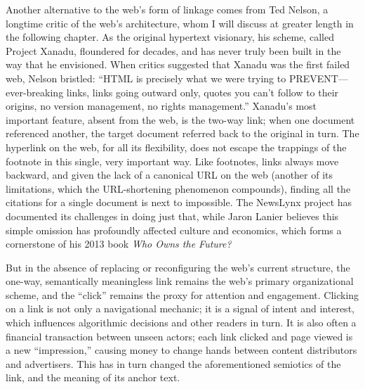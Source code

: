 Another alternative to the web's form of linkage comes from Ted Nelson, a longtime critic of the web's architecture, whom I will discuss at greater length in the following chapter. As the original hypertext visionary, his scheme, called Project Xanadu, floundered for decades, and has never truly been built in the way that he envisioned. When critics suggested that Xanadu was the first failed web, Nelson bristled: ``HTML is precisely what we were trying to PREVENT---ever-breaking links, links going outward only, quotes you can't follow to their origins, no version management, no rights management.''\autocite{nelson_ted_1999} Xanadu's most important feature, absent from the web, is the two-way link; when one document referenced another, the target document referred back to the original in turn. The hyperlink on the web, for all its flexibility, does not escape the trappings of the footnote in this single, very important way. Like footnotes, links always move backward, and given the lack of a canonical URL on the web (another of its limitations, which the URL-shortening phenomenon compounds), finding all the citations for a single document is next to impossible. The NewsLynx project has documented its challenges in doing just that, while Jaron Lanier believes this simple omission has profoundly affected culture and economics, which forms a cornerstone of his 2013 book \emph{Who Owns the Future?}\autocite[Chapter 18]{lanier_who_2013,abelson_hyper-compensation:_2014}

But in the absence of replacing or reconfiguring the web's current structure, the one-way, semantically meaningless link remains the web's primary organizational scheme, and the ``click'' remains the proxy for attention and engagement. Clicking on a link is not only a navigational mechanic; it is a signal of intent and interest, which influences algorithmic decisions and other readers in turn. It is also often a financial transaction between unseen actors; each link clicked and page viewed is a new ``impression,'' causing money to change hands between content distributors and advertisers. This has in turn changed the aforementioned semiotics of the link, and the meaning of its anchor text.

